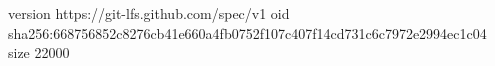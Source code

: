 version https://git-lfs.github.com/spec/v1
oid sha256:668756852c8276cb41e660a4fb0752f107c407f14cd731c6c7972e2994ec1c04
size 22000
